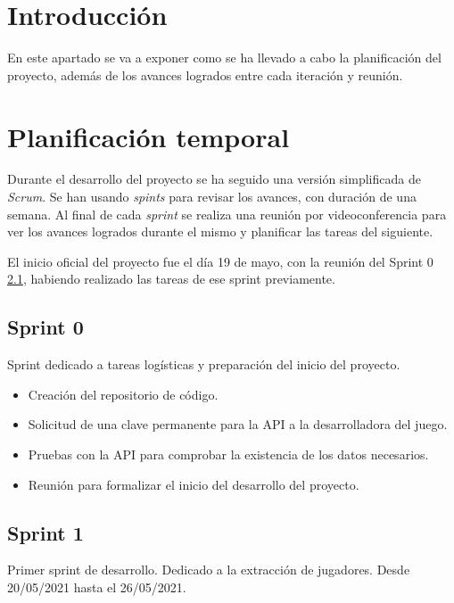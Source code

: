 
\section{Introducción}

En este apartado se va a exponer como se ha llevado a cabo la planificación del proyecto, además de los avances logrados entre cada iteración y reunión.

\section{Planificación temporal}

Durante el desarrollo del proyecto se ha seguido una versión simplificada de \textit{Scrum}. Se han usando \textit{spints} para revisar los avances, con duración de una semana. Al final de cada \textit{sprint} se realiza una reunión por videoconferencia para ver los avances logrados durante el mismo y planificar las tareas del siguiente.

El inicio oficial del proyecto fue el día 19 de mayo, con la reunión del Sprint 0 \ref{sprint-0}, habiendo realizado las tareas de ese sprint previamente.

\subsection{Sprint 0}\label{sprint-0}

Sprint dedicado a tareas logísticas y preparación del inicio del proyecto.

\begin{itemize}
    \item Creación del repositorio de código.
    \item Solicitud de una clave permanente para la API a la desarrolladora del juego.
    \item Pruebas con la API para comprobar la existencia de los datos necesarios.
    \item Reunión para formalizar el inicio del desarrollo del proyecto.
\end{itemize}

\subsection{Sprint 1}

Primer sprint de desarrollo. Dedicado a la extracción de jugadores. Desde 20/05/2021 hasta el 26/05/2021.

